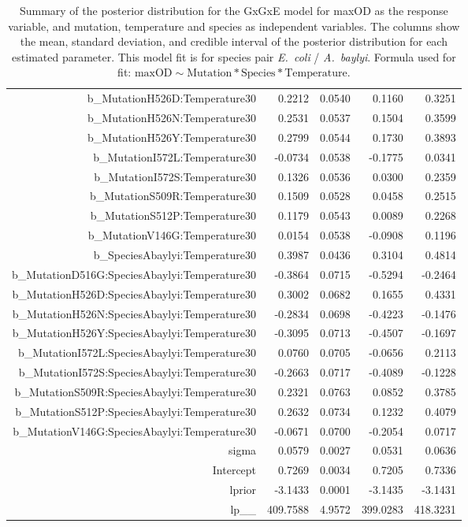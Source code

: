 \begin{table}[ht]
\begin{tabular}{rrrrr}
  b\_MutationH526D:Temperature30 & 0.2212 & 0.0540 & 0.1160 & 0.3251 \\ 
  b\_MutationH526N:Temperature30 & 0.2531 & 0.0537 & 0.1504 & 0.3599 \\ 
  b\_MutationH526Y:Temperature30 & 0.2799 & 0.0544 & 0.1730 & 0.3893 \\ 
  b\_MutationI572L:Temperature30 & -0.0734 & 0.0538 & -0.1775 & 0.0341 \\ 
  b\_MutationI572S:Temperature30 & 0.1326 & 0.0536 & 0.0300 & 0.2359 \\ 
  b\_MutationS509R:Temperature30 & 0.1509 & 0.0528 & 0.0458 & 0.2515 \\ 
  b\_MutationS512P:Temperature30 & 0.1179 & 0.0543 & 0.0089 & 0.2268 \\ 
  b\_MutationV146G:Temperature30 & 0.0154 & 0.0538 & -0.0908 & 0.1196 \\ 
  b\_SpeciesAbaylyi:Temperature30 & 0.3987 & 0.0436 & 0.3104 & 0.4814 \\ 
  b\_MutationD516G:SpeciesAbaylyi:Temperature30 & -0.3864 & 0.0715 & -0.5294 & -0.2464 \\ 
  b\_MutationH526D:SpeciesAbaylyi:Temperature30 & 0.3002 & 0.0682 & 0.1655 & 0.4331 \\ 
  b\_MutationH526N:SpeciesAbaylyi:Temperature30 & -0.2834 & 0.0698 & -0.4223 & -0.1476 \\ 
  b\_MutationH526Y:SpeciesAbaylyi:Temperature30 & -0.3095 & 0.0713 & -0.4507 & -0.1697 \\ 
  b\_MutationI572L:SpeciesAbaylyi:Temperature30 & 0.0760 & 0.0705 & -0.0656 & 0.2113 \\ 
  b\_MutationI572S:SpeciesAbaylyi:Temperature30 & -0.2663 & 0.0717 & -0.4089 & -0.1228 \\ 
  b\_MutationS509R:SpeciesAbaylyi:Temperature30 & 0.2321 & 0.0763 & 0.0852 & 0.3785 \\ 
  b\_MutationS512P:SpeciesAbaylyi:Temperature30 & 0.2632 & 0.0734 & 0.1232 & 0.4079 \\ 
  b\_MutationV146G:SpeciesAbaylyi:Temperature30 & -0.0671 & 0.0700 & -0.2054 & 0.0717 \\ 
  sigma & 0.0579 & 0.0027 & 0.0531 & 0.0636 \\ 
  Intercept & 0.7269 & 0.0034 & 0.7205 & 0.7336 \\ 
  lprior & -3.1433 & 0.0001 & -3.1435 & -3.1431 \\ 
  lp\_\_ & 409.7588 & 4.9572 & 399.0283 & 418.3231 \\ 
   \hline
\end{tabular}
\endgroup
\caption{Summary of the posterior distribution for the GxGxE model for maxOD as the response variable, and mutation, temperature and species as independent variables. The columns show the mean, standard deviation, and credible interval of the posterior distribution for each estimated parameter. This model fit is for species pair \textit{E.~coli} / \textit{A.~baylyi}. Formula used for fit: $\text{maxOD} \sim \text{Mutation} * \text{Species} * \text{Temperature}$.} 
\label{supptab:GxGxE_maxOD}
\end{table}



